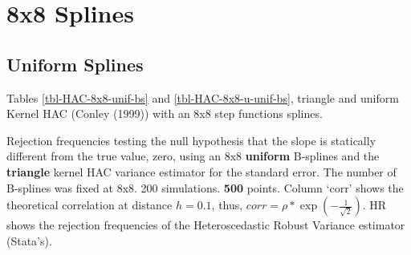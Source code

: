 \documentclass[
]{article}
\begin{document}
\section{8x8 Splines}\label{x8-splines}

\subsection{Uniform Splines}\label{uniform-splines}

Tables \ref{tbl-HAC-8x8-unif-bs} and \ref{tbl-HAC-8x8-u-unif-bs},
triangle and uniform Kernel HAC (Conley (1999)) with an 8x8 step
functions splines.

\begin{table}

\caption{\label{tbl-HAC-8x8-unif-bs}Rejection frequencies testing the
null hypothesis that the slope is statically different from the true
value, zero, using an 8x8 \textbf{uniform} B-splines and the
\textbf{triangle} kernel HAC variance estimator for the standard error.
The number of B-splines was fixed at 8x8. 200 simulations. \textbf{500}
points. Column `corr' shows the theoretical correlation at distance
\(h=0.1\), thus, \(corr=\rho*\exp(-\frac{1}{\sqrt{2}})\). HR shows the
rejection frequencies of the Heteroscedastic Robust Variance estimator
(Stata's).}

\centering{

}
\end{table}
\end{document}
